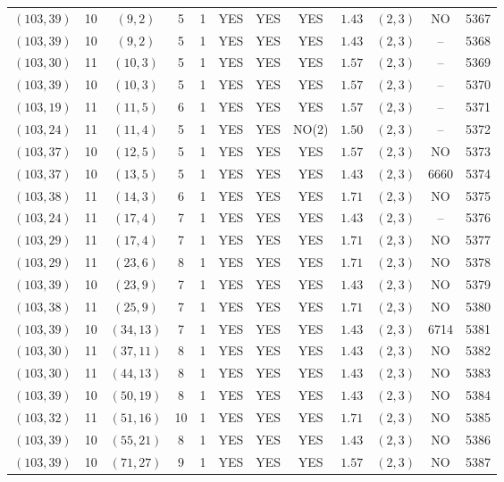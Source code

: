 \begin{longtable}{|c|c|c|c|c|c|c|c|c|c|c|c|}
$(103,39)$ & 10 & $(9,2)$ & 5 & 1 & YES & YES & YES & $1.43$ & $(2,3)$ & NO & 5367\\
$(103,39)$ & 10 & $(9,2)$ & 5 & 1 & YES & YES & YES & $1.43$ & $(2,3)$ & -- & 5368\\
$(103,30)$ & 11 & $(10,3)$ & 5 & 1 & YES & YES & YES & $1.57$ & $(2,3)$ & -- & 5369\\
$(103,39)$ & 10 & $(10,3)$ & 5 & 1 & YES & YES & YES & $1.57$ & $(2,3)$ & -- & 5370\\
$(103,19)$ & 11 & $(11,5)$ & 6 & 1 & YES & YES & YES & $1.57$ & $(2,3)$ & -- & 5371\\
$(103,24)$ & 11 & $(11,4)$ & 5 & 1 & YES & YES & NO(2) & $1.50$ & $(2,3)$ & -- & 5372\\
$(103,37)$ & 10 & $(12,5)$ & 5 & 1 & YES & YES & YES & $1.57$ & $(2,3)$ & NO & 5373\\
$(103,37)$ & 10 & $(13,5)$ & 5 & 1 & YES & YES & YES & $1.43$ & $(2,3)$ & 6660 & 5374\\
$(103,38)$ & 11 & $(14,3)$ & 6 & 1 & YES & YES & YES & $1.71$ & $(2,3)$ & NO & 5375\\
$(103,24)$ & 11 & $(17,4)$ & 7 & 1 & YES & YES & YES & $1.43$ & $(2,3)$ & -- & 5376\\
$(103,29)$ & 11 & $(17,4)$ & 7 & 1 & YES & YES & YES & $1.71$ & $(2,3)$ & NO & 5377\\
$(103,29)$ & 11 & $(23,6)$ & 8 & 1 & YES & YES & YES & $1.71$ & $(2,3)$ & NO & 5378\\
$(103,39)$ & 10 & $(23,9)$ & 7 & 1 & YES & YES & YES & $1.43$ & $(2,3)$ & NO & 5379\\
$(103,38)$ & 11 & $(25,9)$ & 7 & 1 & YES & YES & YES & $1.71$ & $(2,3)$ & NO & 5380\\
$(103,39)$ & 10 & $(34,13)$ & 7 & 1 & YES & YES & YES & $1.43$ & $(2,3)$ & 6714 & 5381\\
$(103,30)$ & 11 & $(37,11)$ & 8 & 1 & YES & YES & YES & $1.43$ & $(2,3)$ & NO & 5382\\
$(103,30)$ & 11 & $(44,13)$ & 8 & 1 & YES & YES & YES & $1.43$ & $(2,3)$ & NO & 5383\\
$(103,39)$ & 10 & $(50,19)$ & 8 & 1 & YES & YES & YES & $1.43$ & $(2,3)$ & NO & 5384\\
$(103,32)$ & 11 & $(51,16)$ & 10 & 1 & YES & YES & YES & $1.71$ & $(2,3)$ & NO & 5385\\
$(103,39)$ & 10 & $(55,21)$ & 8 & 1 & YES & YES & YES & $1.43$ & $(2,3)$ & NO & 5386\\
$(103,39)$ & 10 & $(71,27)$ & 9 & 1 & YES & YES & YES & $1.57$ & $(2,3)$ & NO & 5387\\

\end{longtable}
